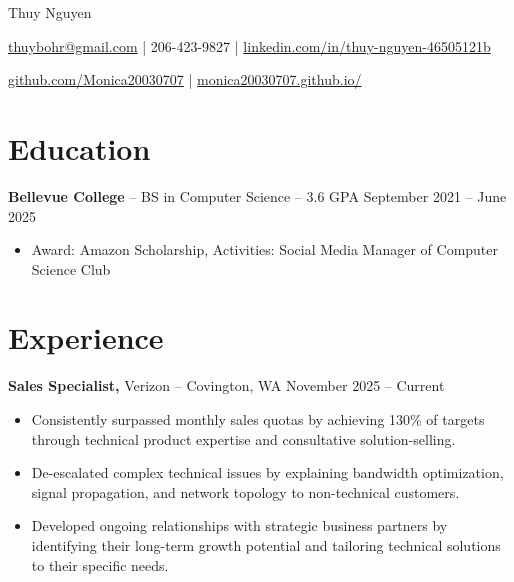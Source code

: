 \documentclass[11pt]{article}       %
\begin{document}
\centerline{\Huge Thuy Nguyen}

\vspace{5pt}

\centerline{\href{mailto:thuybohr@gmail.com}{thuybohr@gmail.com} | 206-423-9827 |
\href{https://www.linkedin.com/in/thuy-nguyen-46505121b/}{linkedin.com/in/thuy-nguyen-46505121b}}

\centerline{\href{https://github.com/Monica20030707}{github.com/Monica20030707} | 
\href{https://monica20030707.github.io/}{monica20030707.github.io/}} 

\vspace{-9pt}

\section*{Education}
\textbf{Bellevue College} -- BS in Computer Science -- 3.6 GPA \hfill September 2021 -- June 2025\\
\vspace{-9pt}
\begin{itemize}
  \item Award: Amazon Scholarship, Activities: Social Media Manager of Computer Science Club
\end{itemize}

\vspace{-18.5pt}

\section*{Experience}

\textbf{Sales Specialist,} {Verizon} -- Covington, WA \hfill November 2025 -- Current \\
\vspace{-9pt}
\begin{itemize}
  \item Consistently surpassed monthly sales quotas by achieving 130\% of targets through technical product expertise and consultative solution-selling.
  \item De-escalated complex technical issues by explaining bandwidth optimization, signal propagation, and network topology to non-technical customers.
  \item Developed ongoing relationships with strategic business partners by identifying their long-term growth potential and tailoring technical solutions to their specific needs.
\end{itemize}
\end{document}
